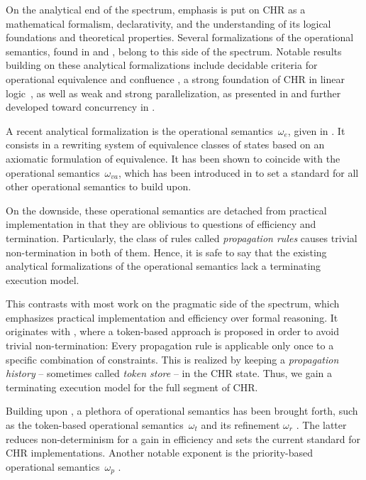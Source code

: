 \documentclass{tlp}
\begin{document}
On the analytical end of the spectrum, emphasis is put on CHR as a mathematical
formalism, declarativity, and the understanding of its logical foundations and
theoretical properties. Several formalizations of the operational semantics,
found in \cite{Fruhwirth1993,fruehwirth98} and \cite{fruehwirthabdennadher03},
belong to this side of the spectrum. Notable results building on these analytical
formalizations include decidable criteria for operational equivalence
\cite{abdennadherfruehwirth99} and confluence
\cite{abdennadherfruehwirthmeuss99}, a strong foundation of CHR in linear
logic~\cite{betzfruehwirth05}, as well as weak and strong parallelization, as
presented in \cite{fruehwirth05} and further developed toward concurrency in
\cite{Sulzmann2007,Sulzmann2008}.

A recent analytical formalization is the operational semantics~$\omega_e$, given
in \cite{Raiser2009a}. It consists in a rewriting system of equivalence classes
of states based on an axiomatic formulation of equivalence. It has been shown to
coincide with the operational semantics~$\omega_{va}$, which has been introduced
in \cite{fruehwirth09} to set a standard for all other operational semantics to
build upon.

On the downside, these operational semantics are detached from practical
implementation in that they are oblivious to questions of efficiency and
termination. Particularly, the class of rules called \emph{propagation rules}
causes trivial non-termination in both of them. Hence, it is safe to say that
the existing analytical formalizations of the operational semantics lack a 
terminating execution model.

This contrasts with most work on the pragmatic side of the spectrum, which
emphasizes practical implementation and efficiency over formal reasoning. It
originates with \cite{abdennadher97}, where a token-based approach is proposed in
order to avoid trivial non-termination: Every propagation rule is applicable only
once to a specific combination of constraints.  This is realized by keeping a
\emph{propagation history} -- sometimes called \emph{token store} -- in the CHR
state. Thus, we gain a terminating execution model for the full segment of CHR.

Building upon \cite{abdennadher97}, a plethora of operational semantics has been
brought forth, such as the token-based operational semantics~$\omega_t$ and its
refinement $\omega_r$ \cite{Duck2004}. The latter reduces non-determinism for a
gain in efficiency and sets the current standard for CHR implementations. Another
notable exponent is the priority-based operational semantics~$\omega_p$
\cite{dekoninckschrijversdemoen07}.
\end{document}
